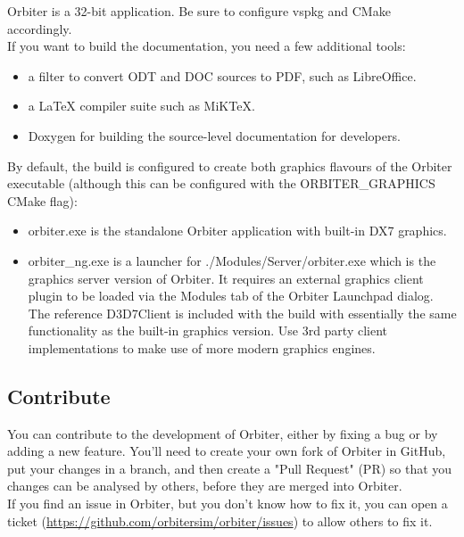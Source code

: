 \documentclass[Orbiter Developer Manual.tex]{subfiles}
\begin{document}
\noindent
Orbiter is a 32-bit application. Be sure to configure vspkg and CMake accordingly.\\
If you want to build the documentation, you need a few additional tools:

\begin{itemize}
\item a filter to convert ODT and DOC sources to PDF, such as LibreOffice.%
\item a LaTeX compiler suite such as MiKTeX.
\item Doxygen for building the source-level documentation for developers.
\end{itemize}

\noindent
By default, the build is configured to create both graphics flavours of the Orbiter executable (although this can be configured with the ORBITER\_GRAPHICS CMake flag):

\begin{itemize}
\item orbiter.exe is the standalone Orbiter application with built-in DX7 graphics.
\item orbiter\_ng.exe is a launcher for ./Modules/Server/orbiter.exe which is the graphics server version of Orbiter. It requires an external graphics client plugin to be loaded via the Modules tab of the Orbiter Launchpad dialog. The reference D3D7Client is included with the build with essentially the same functionality as the built-in graphics version. Use 3rd party client implementations to make use of more modern graphics engines.
\end{itemize}


\subsection{Contribute}
You can contribute to the development of Orbiter, either by fixing a bug or by adding a new feature. You'll need to create your own fork of Orbiter in GitHub, put your changes in a branch, and then create a "Pull Request" (PR) so that you changes can be analysed by others, before they are merged into Orbiter.\\
If you find an issue in Orbiter, but you don't know how to fix it, you can open a ticket (\url{https://github.com/orbitersim/orbiter/issues}) to allow others to fix it.
\end{document}
